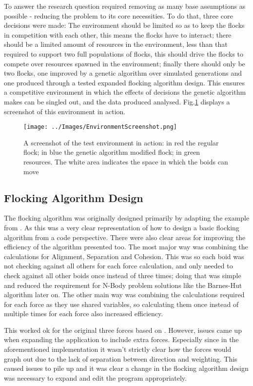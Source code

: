To answer the research question required removing as many base assumptions as possible - reducing the problem to its core necessities. To do that, three core decisions were made: The environment should be limited so as to keep the flocks in competition with each other, this means the flocks have to interact; there should be a limited amount of resources in the environment, less than that required to support two full populations of flocks, this should drive the flocks to compete over resources spawned in the environment; finally there should only be two flocks, one improved by a genetic algorithm over simulated generations and one produced through a tested expanded flocking algorithm design. This ensures a competitive environment in which the effects of decisions the genetic algorithm makes can be singled out, and the data produced analysed. Fig.\ref{fig:EnvScrnshot} displays a screenshot of this environment in action.
\begin{figure}
	\texttt{[image: ../Images/EnvironmentScreenshot.png]}
	\caption{A screenshot of the test environment in action: in red the regular flock; in blue the genetic algorithm modified flock; in green resources. The white area indicates the space in which the boids can move}
	\label{fig:EnvScrnshot}
\end{figure}


\subsection{Flocking Algorithm Design}
The flocking algorithm was originally designed primarily by adapting the example from \citet{flockingprocessingorg}. As this was a very clear representation of how to design a basic flocking algorithm from a code perspective. There were also clear areas for improving the efficiency of the algorithm presented too. The most major way was combining the calculations for Alignment, Separation and Cohesion. This was so each boid was not checking against all others for each force calculation, and only needed to check against all other boids once instead of three times; doing that was simple and reduced the requirement for N-Body problem solutions like the Barnes-Hut algorithm later on. The other main way was combining the calculations required for each force as they use shared variables, so calculating them once instead of multiple times for each force also increased efficiency.

This worked ok for the original three forces based on \citet{Reynolds:1987:FHS:37402.37406}. However, issues came up when expanding the application to include extra forces. Especially since in the aforementioned implementation it wasn't strictly clear how the forces would graph out due to the lack of separation between direction and weighting. This caused issues to pile up and it was clear a change in the flocking algorithm design was necessary to expand and edit the program appropriately.

